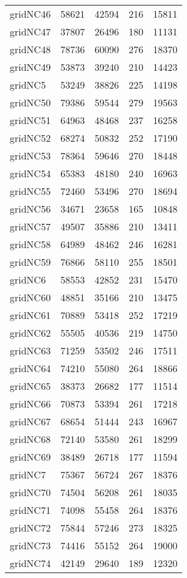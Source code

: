 \begin{tabular}{lrrrr}
gridNC46 & 58621 & 42594 & 216 & 15811 \\
gridNC47 & 37807 & 26496 & 180 & 11131 \\
gridNC48 & 78736 & 60090 & 276 & 18370 \\
gridNC49 & 53873 & 39240 & 210 & 14423 \\
gridNC5 & 53249 & 38826 & 225 & 14198 \\
gridNC50 & 79386 & 59544 & 279 & 19563 \\
gridNC51 & 64963 & 48468 & 237 & 16258 \\
gridNC52 & 68274 & 50832 & 252 & 17190 \\
gridNC53 & 78364 & 59646 & 270 & 18448 \\
gridNC54 & 65383 & 48180 & 240 & 16963 \\
gridNC55 & 72460 & 53496 & 270 & 18694 \\
gridNC56 & 34671 & 23658 & 165 & 10848 \\
gridNC57 & 49507 & 35886 & 210 & 13411 \\
gridNC58 & 64989 & 48462 & 246 & 16281 \\
gridNC59 & 76866 & 58110 & 255 & 18501 \\
gridNC6 & 58553 & 42852 & 231 & 15470 \\
gridNC60 & 48851 & 35166 & 210 & 13475 \\
gridNC61 & 70889 & 53418 & 252 & 17219 \\
gridNC62 & 55505 & 40536 & 219 & 14750 \\
gridNC63 & 71259 & 53502 & 246 & 17511 \\
gridNC64 & 74210 & 55080 & 264 & 18866 \\
gridNC65 & 38373 & 26682 & 177 & 11514 \\
gridNC66 & 70873 & 53394 & 261 & 17218 \\
gridNC67 & 68654 & 51444 & 243 & 16967 \\
gridNC68 & 72140 & 53580 & 261 & 18299 \\
gridNC69 & 38489 & 26718 & 177 & 11594 \\
gridNC7 & 75367 & 56724 & 267 & 18376 \\
gridNC70 & 74504 & 56208 & 261 & 18035 \\
gridNC71 & 74098 & 55458 & 264 & 18376 \\
gridNC72 & 75844 & 57246 & 273 & 18325 \\
gridNC73 & 74416 & 55152 & 264 & 19000 \\
gridNC74 & 42149 & 29640 & 189 & 12320 \\

\end{tabular}
